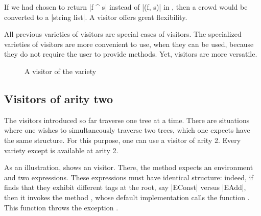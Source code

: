 \documentclass[11pt,a4paper,twoside]{article}
\begin{document}
If we had chosen to return \oc|f ^ s| instead of \oc|(f, s)| in
, then a crowd would be converted to
a \oc|string list|. A \fold visitor offers great flexibility.

All previous varieties of visitors are special cases of \fold visitors. The
specialized varieties of visitors are more convenient to use, when they can be
used, because they do not require the user to provide \tyconascendingmethod{}
methods. Yet, \fold visitors are more versatile.



\begin{figure}[p]
\vspace{-\baselineskip}
\caption{A visitor of the \itertwo variety}
\label{fig:expr02}
\end{figure}

\begin{comment}
\begin{figure}[p]
\orig{expr03}
\vspace{-\baselineskip}
\processed{expr03}
\caption{A visitor of the \maptwo variety}
\label{fig:expr03}
\end{figure}
\end{comment}

\subsection{Visitors of arity two}
\label{sec:intro:aritytwo}

The visitors introduced so far traverse one tree at a time. There are
situations where one wishes to simultaneously traverse two trees, which one
expects have the same structure. For this purpose, one can use a visitor of
arity 2. Every variety except \mapendo is available at arity 2.

As an illustration,  shows an \itertwo visitor. There, the
method  expects an environment and two expressions. These
expressions must have identical structure: indeed, if 
finds that they exhibit different tags at the root, say \oc|EConst| versus
\oc|EAdd|, then it invokes the method , whose default
implementation calls the function . This function
throws the exception .
\end{document}
